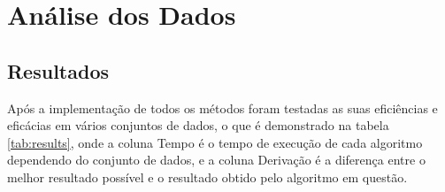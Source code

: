 
\chapter{Análise dos Dados}






\section{Resultados}

Após a implementação de todos os métodos foram testadas as suas eficiências e eficácias em vários conjuntos de dados, o que é demonstrado na tabela \ref{tab:results}, onde a coluna Tempo é o tempo de execução de cada algoritmo dependendo do conjunto de dados, e a coluna Derivação é a diferença entre o melhor resultado possível e o resultado obtido pelo algoritmo em questão.

